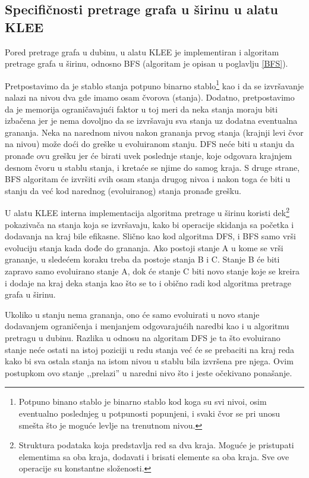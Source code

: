 \documentclass[12pt,oneside]{memoir}
\begin{document}
\subsection{Specifičnosti pretrage grafa u širinu u alatu KLEE} 
Pored pretrage grafa u dubinu, u alatu KLEE je implementiran i algoritam pretrage grafa u širinu, odnosno BFS (algoritam je opisan u poglavlju \ref{BFS}).

Pretpostavimo da je stablo stanja potpuno binarno stablo\footnote[5]{Potpuno binano stablo je binarno stablo kod koga su svi nivoi, osim eventualno poslednjeg u potpunosti popunjeni, i svaki čvor se pri unosu smešta što je moguće levlje na trenutnom nivou.} kao i da se izvršavanje nalazi na nivou dva gde imamo osam čvorova (stanja). Dodatno, pretpostavimo da je memorija ograničavajući faktor u toj meri da neka stanja moraju biti izbačena jer je nema dovoljno da se izvršavaju sva stanja uz dodatna eventualna grananja. Neka na narednom nivou nakon grananja prvog stanja (krajnji levi čvor na nivou) može doći do greške u evoluiranom stanju. DFS neće biti u stanju da pronađe ovu grešku jer će birati uvek poslednje stanje, koje odgovara krajnjem desnom čvoru u stablu stanja, i kretaće se njime do samog kraja. S druge strane, BFS algoritam će izvršiti svih osam stanja drugog nivoa i nakon toga će biti u stanju da već kod narednog (evoluiranog) stanja pronađe grešku. 

U alatu KLEE interna implementacija algoritma pretrage u širinu koristi dek\footnote[6]{Struktura podataka koja predstavlja red sa dva kraja. Moguće je pristupati elementima sa oba kraja, dodavati i brisati elemente sa oba kraja. Sve ove operacije su konstantne složenosti.} pokazivača na stanja koja se izvršavaju, kako bi operacije skidanja sa početka i dodavanja na kraj bile efikasne. Slično kao kod algoritma DFS, i BFS samo vrši evoluciju stanja kada dođe do grananja. Ako postoji stanje A u kome se vrši grananje, u sledećem koraku treba da postoje stanja B i C. Stanje B će biti zapravo samo evoluirano stanje A, dok će stanje C biti novo stanje koje se kreira i dodaje na kraj deka stanja kao što se to i obično radi kod algoritma pretrage grafa u širinu. 

Ukoliko u stanju nema grananja, ono će samo evoluirati u novo stanje dodavanjem ograničenja i menjanjem odgovarajućih naredbi kao i u algoritmu pretragu u dubinu. Razlika u odnosu na algoritam DFS je ta što evoluirano stanje neće ostati na istoj poziciji u redu stanja već će se prebaciti na kraj reda kako bi sva ostala stanja na istom nivou u stablu bila izvršena pre njega. Ovim postupkom ovo stanje ,,prelazi'' u naredni nivo što i jeste očekivano ponašanje. 
\end{document}
